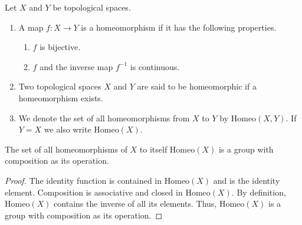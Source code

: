 \begin{defbox}
    \begin{definition}[Homeomorphism]
        Let \(X\) and \(Y\) be {\color{mathif}topological spaces}.
        \begin{enumerate}
            \item A {\color{mathobj}map} \(f: X \longrightarrow Y\) is a {\color{maththen}homeomorphism} if it has the following properties.

            \begin{enumerate}
                \item \(f\) is {\color{mathif}bijective}.
                \item \(f\) and the {\color{mathif}inverse map} \(f^{-1}\) is {\color{mathif}continuous}.
            \end{enumerate}

            \item Two topological spaces \(X\) and \(Y\) are said to be {\color{maththen}homeomorphic} if a homeomorphism exists.

            \item We denote the set of all homeomorphisms from \(X\) to \(Y\) by \(\mathrm{Homeo}(X, Y)\). If \(Y = X\) we also write \(\mathrm{Homeo}(X)\).
        \end{enumerate}
    \end{definition}
\end{defbox}

\begin{thmbox}
    \begin{proposition}
        The set of all homeomorphisms of \(X\) to itself \(\mathrm{Homeo}(X)\) is a group with composition as its operation.
    \end{proposition}
\end{thmbox}

\begin{proof}
    The identity function is contained in \(\mathrm{Homeo}(X)\) and is the identity element. Composition is associative and closed in \(\mathrm{Homeo}(X)\). By definition, \(\mathrm{Homeo}(X)\) contains the inverse of all its elements. Thus, \(\mathrm{Homeo}(X)\) is a group with composition as its operation.
\end{proof}

